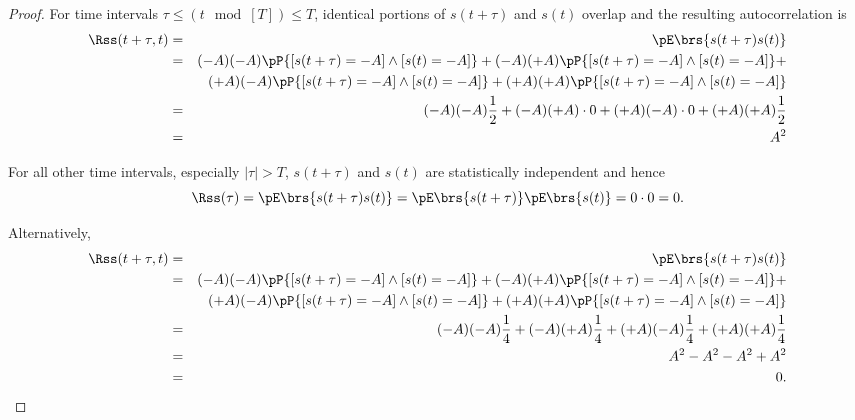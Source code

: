 \begin{proof}
For time intervals $\tau \le (t\mod[T])\le T$, 
identical portions of $s(t+\tau)$ and $s(t)$
overlap and the resulting autocorrelation is
\begin{eqnarray*}
   \Rss(t+\tau,t) 
     &=& \pE\brs{s(t+\tau)s(t)} 
   \\&=& (-A)(-A)\pP{[s(t+\tau)=-A]\land [s(t)=-A]} + 
         (-A)(+A)\pP{[s(t+\tau)=-A]\land [s(t)=-A]} + \\&&
         (+A)(-A)\pP{[s(t+\tau)=-A]\land [s(t)=-A]} + 
         (+A)(+A)\pP{[s(t+\tau)=-A]\land [s(t)=-A]} 
   \\&=& (-A)(-A)\frac{1}{2} + 
         (-A)(+A)\cdot 0 +
         (+A)(-A)\cdot 0 +
         (+A)(+A)\frac{1}{2} 
   \\&=& A^2
\end{eqnarray*}

For all other time intervals, especially $|\tau|>T$,
$s(t+\tau)$ and $s(t)$ are statistically independent and hence
 \[ \Rss(\tau) = \pE\brs{s(t+\tau)s(t)} = \pE\brs{s(t+\tau)}\pE\brs{s(t)} = 0\cdot0 = 0.\]

Alternatively,
\begin{eqnarray*}
   \Rss(t+\tau,t) 
     &=& \pE\brs{s(t+\tau)s(t)} 
   \\&=& (-A)(-A)\pP{[s(t+\tau)=-A]\land [s(t)=-A]} + 
         (-A)(+A)\pP{[s(t+\tau)=-A]\land [s(t)=-A]} + \\&&
         (+A)(-A)\pP{[s(t+\tau)=-A]\land [s(t)=-A]} + 
         (+A)(+A)\pP{[s(t+\tau)=-A]\land [s(t)=-A]} 
   \\&=& (-A)(-A)\frac{1}{4} + 
         (-A)(+A)\frac{1}{4} +
         (+A)(-A)\frac{1}{4} +
         (+A)(+A)\frac{1}{4} 
   \\&=& A^2 -A^2 -A^2 + A^2
   \\&=& 0.
\end{eqnarray*}

\end{proof}


